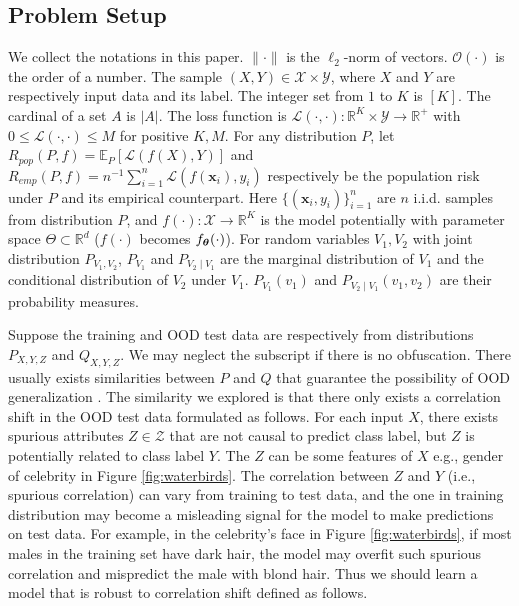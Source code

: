 \documentclass{article} %
\newcommand{\btheta}{\text{\boldmath{$\theta$}}}
\newcommand{\bx}{\boldsymbol{x}}
\newcommand{\bbR}{\mathbb{R}}
\newcommand{\mE}{\mathbb{E}}
\newcommand{\cX}{\mathcal{X}}
\newcommand{\cY}{\mathcal{Y}}
\newcommand{\cZ}{\mathcal{Z}}
\newcommand{\cL}{\mathcal{L}}
\newcommand{\cO}{\mathcal{O}}
\begin{document}
	\subsection{Problem Setup}\label{sec:notions}
	We collect the notations in this paper. $\|\cdot\|$ is the $\ell_{2}$-norm of vectors. $\cO(\cdot)$ is the order of a number. The sample $(X, Y)\in\cX\times\cY$, where $X$ and $Y$ are respectively input data and its label. The integer set from $1$ to $K$ is $[K]$. The cardinal of a set $A$ is $|A|$. The loss function is $\cL(\cdot, \cdot):\bbR^{K}\times\cY\rightarrow\bbR^{+}$ with $0 \leq \cL(\cdot, \cdot) \leq M$ for positive $K, M$. For any distribution $P$, let $R_{pop}(P, f) = \mE_{P}[\cL(f(X), Y)]$ and $R_{emp}(P, f) = n^{-1}\sum_{i=1}^{n}\cL(f(\bx_{i}), y_{i})$ respectively be the population risk under $P$ and its empirical counterpart. Here $\{(\bx_{i}, y_{i})\}_{i=1}^{n}$ are $n$ i.i.d. samples from distribution $P$, and $f(\cdot): \cX\rightarrow\bbR^{K}$ is the model potentially with parameter space $\Theta\subset\bbR^{d}$ ($f(\cdot)$ becomes $f_{\btheta}(\cdot)$). For random variables $V_{1}, V_{2}$ with joint distribution $P_{V_{1}, V_{2}}$, $P_{V_{1}}$ and $P_{V_{2}\mid V_{1}}$ are the marginal distribution of $V_{1}$ and the conditional distribution of $V_{2}$ under $V_{1}$. $P_{V_{1}}(v_{1})$ and $P_{V_{2}\mid V_{1}}(v_{1}, v_{2})$ are their probability measures.
	\par
	Suppose the training and OOD test data are respectively from distributions $P_{X, Y, Z}$ and $Q_{X, Y, Z}$. We may neglect the subscript if there is no obfuscation. There usually exists similarities between $P$ and $Q$ that guarantee the possibility of OOD generalization \citep{kpotufe2021marginal}.
	The similarity we explored is that there only exists a correlation shift in the OOD test data formulated as follows. For each input $X$, there exists spurious attributes $Z\in\cZ$ that are not causal to predict class label, but $Z$ is potentially related to class label $Y$. The $Z$ can be some features of $X$ e.g., gender of celebrity in Figure \ref{fig:waterbirds}. The correlation between $Z$ and $Y$ (i.e., spurious correlation) can vary from training to test data, and the one in training distribution may become a misleading signal for the model to make predictions on test data. For example, in the celebrity's face in Figure \ref{fig:waterbirds}, if most males in the training set have dark hair, the model may overfit such spurious correlation and mispredict the male with blond hair. Thus we should learn a model that is robust to correlation shift defined as follows.  
\end{document}
